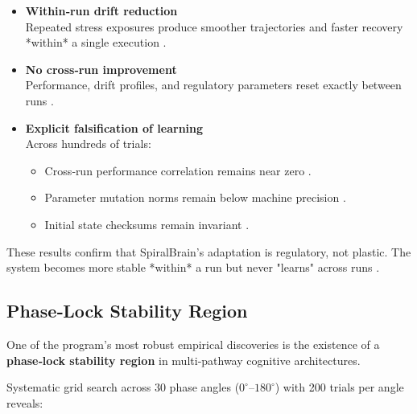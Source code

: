 \documentclass[12pt,a4paper]{report}
\begin{document}
\begin{itemize}
\item \textbf{Within‑run drift reduction} \\
  Repeated stress exposures produce smoother trajectories and faster recovery *within* a single execution \cite{SpiralBrainV3}.

\item \textbf{No cross‑run improvement} \\
  Performance, drift profiles, and regulatory parameters reset exactly between runs \cite{SpiralBrainV3}.

\item \textbf{Explicit falsification of learning} \cite{SpiralBrainV3} \\
  Across hundreds of trials:
  \begin{itemize}
  \item Cross‑run performance correlation remains near zero \cite{SpiralBrainV3}.
  \item Parameter mutation norms remain below machine precision \cite{SpiralBrainV3}.
  \item Initial state checksums remain invariant \cite{SpiralBrainV3}.
  \end{itemize}
\end{itemize}

These results confirm that SpiralBrain’s adaptation is regulatory, not plastic. The system becomes more stable *within* a run but never "learns" across runs \cite{SpiralBrainV3}.

\subsection{Phase‑Lock Stability Region}

One of the program’s most robust empirical discoveries is the existence of a \textbf{phase‑lock stability region} \cite{Kuramoto1975} in multi‑pathway cognitive architectures.

Systematic grid search across 30 phase angles ($0^\circ$–$180^\circ$) with 200 trials per angle reveals:
\end{document}
